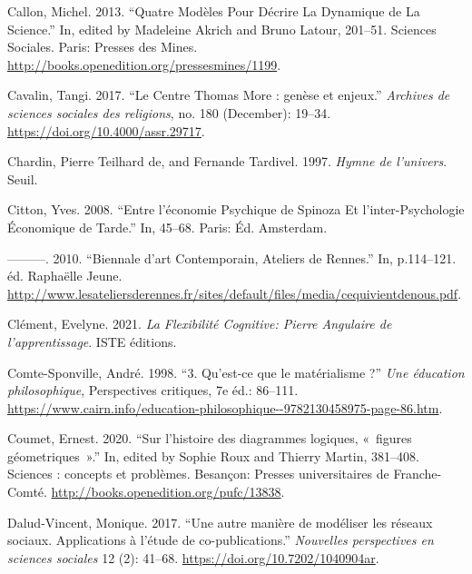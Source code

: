 \documentclass[
  letterpaper,
  DIV=11,
  numbers=noendperiod]{scrreprt}
\newlength{\cslhangindent}
\newlength{\cslentryspacingunit} %
\newenvironment{CSLReferences}[2] %
 {%
  \setlength{\parindent}{0pt}
  \ifodd #1
  \let\oldpar\par
  \def\par{\hangindent=\cslhangindent\oldpar}
  \fi
  \setlength{\parskip}{#2\cslentryspacingunit}
 }%
 {}
\begin{document}
\begin{CSLReferences}{1}{0}
\leavevmode{}%
Callon, Michel. 2013. {``Quatre Modèles Pour Décrire La Dynamique de La
Science.''} In, edited by Madeleine Akrich and Bruno Latour, 201--51.
Sciences Sociales. Paris: Presses des Mines.
\url{http://books.openedition.org/pressesmines/1199}.

\leavevmode{}%
Cavalin, Tangi. 2017. {``Le Centre Thomas More : genèse et enjeux.''}
\emph{Archives de sciences sociales des religions}, no. 180 (December):
19--34. \url{https://doi.org/10.4000/assr.29717}.

\leavevmode{}%
Chardin, Pierre Teilhard de, and Fernande Tardivel. 1997. \emph{Hymne de
l'univers}. Seuil.

\leavevmode{}%
Citton, Yves. 2008. {``Entre l'économie Psychique de Spinoza Et
l'inter-Psychologie Économique de Tarde.''} In, 45--68. Paris: Éd.
Amsterdam.

\leavevmode{}%
---------. 2010. {``Biennale d{'}art Contemporain, Ateliers de
Rennes.''} In, p.114--121. éd. Raphaëlle Jeune.
\url{http://www.lesateliersderennes.fr/sites/default/files/media/cequivientdenous.pdf}.

\leavevmode{}%
Clément, Evelyne. 2021. \emph{La Flexibilité Cognitive: Pierre Angulaire
de l'apprentissage}. ISTE éditions.

\leavevmode{}%
Comte-Sponville, André. 1998. {``3. Qu'est-ce que le matérialisme ?''}
\emph{Une éducation philosophique}, Perspectives critiques, 7e éd.:
86--111.
\url{https://www.cairn.info/education-philosophique--9782130458975-page-86.htm}.

\leavevmode{}%
Coumet, Ernest. 2020. {``Sur l{'}histoire des diagrammes logiques,
«~figures géometriques~».''} In, edited by Sophie Roux and Thierry
Martin, 381--408. Sciences : concepts et problèmes. Besançon: Presses
universitaires de Franche-Comté.
\url{http://books.openedition.org/pufc/13838}.

\leavevmode{}%
Dalud-Vincent, Monique. 2017. {``Une autre manière de modéliser les
réseaux sociaux. Applications à l{'}étude de co-publications.''}
\emph{Nouvelles perspectives en sciences sociales} 12 (2): 41--68.
\url{https://doi.org/10.7202/1040904ar}.


\end{CSLReferences}
\end{document}

